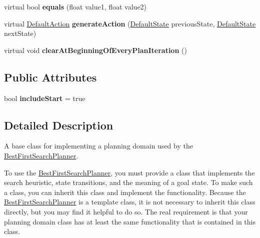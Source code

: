 \begin{DoxyCompactItemize}
\item 
\hypertarget{class_planning_domain_base_a8b9474ee3dd5760a606ac9f9bc706b12}{virtual bool {\bfseries equals} (float value1, float value2)}\label{class_planning_domain_base_a8b9474ee3dd5760a606ac9f9bc706b12}

\item 
\hypertarget{class_planning_domain_base_a3fdc90c8ec2695356dc31e8931fe20ae}{virtual \hyperlink{class_default_action}{Default\-Action} {\bfseries generate\-Action} (\hyperlink{class_default_state}{Default\-State} previous\-State, \hyperlink{class_default_state}{Default\-State} next\-State)}\label{class_planning_domain_base_a3fdc90c8ec2695356dc31e8931fe20ae}

\item 
\hypertarget{class_planning_domain_base_a55c9b54b912f437ef1d6b8f36ebaa4b6}{virtual void {\bfseries clear\-At\-Beginning\-Of\-Every\-Plan\-Iteration} ()}\label{class_planning_domain_base_a55c9b54b912f437ef1d6b8f36ebaa4b6}

\end{DoxyCompactItemize}
\subsection*{Public Attributes}
\begin{DoxyCompactItemize}
\item 
\hypertarget{class_planning_domain_base_a85fab48a5d3ef708964d025d7f839457}{bool {\bfseries include\-Start} = true}\label{class_planning_domain_base_a85fab48a5d3ef708964d025d7f839457}

\end{DoxyCompactItemize}


\subsection{Detailed Description}
A base class for implementing a planning domain used by the \hyperlink{class_best_first_search_planner}{Best\-First\-Search\-Planner}. 

To use the \hyperlink{class_best_first_search_planner}{Best\-First\-Search\-Planner}, you must provide a class that implements the search heuristic, state transitions, and the meaning of a goal state. To make such a class, you can inherit this class and implement the functionality. Because the \hyperlink{class_best_first_search_planner}{Best\-First\-Search\-Planner} is a template class, it is not necessary to inherit this class directly, but you may find it helpful to do so. The real requirement is that your planning domain class has at least the same functionality that is contained in this class.

